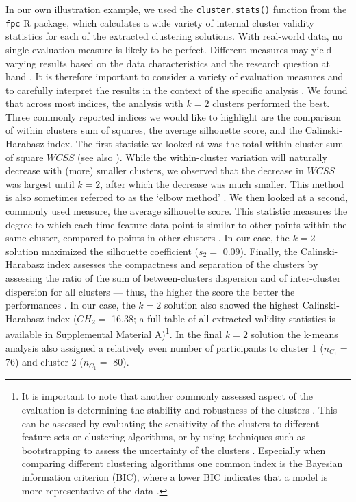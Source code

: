 In our own illustration example, we used the \texttt{cluster.stats()}
function from the \texttt{fpc} \textsf{R} package, which calculates a
wide variety of internal cluster validity statistics for each of the
extracted clustering solutions. With real-world data, no single
evaluation measure is likely to be perfect. Different measures may yield
varying results based on the data characteristics and the research
question at hand \citep{kittler1998}. It is therefore important to
consider a variety of evaluation measures and to carefully interpret the
results in the context of the specific analysis \citep{vinh2009}. We
found that across most indices, the analysis with \(k=2\) clusters
performed the best. Three commonly reported indices we would like to
highlight are the comparison of within clusters sum of squares, the
average silhouette score, and the Calinski-Harabasz index. The first
statistic we looked at was the total within-cluster sum of square
\(WCSS\) (see also ). While the within-cluster
variation will naturally decrease with (more) smaller clusters, we
observed that the decrease in \(WCSS\) was largest until \(k=2\), after
which the decrease was much smaller. This method is also sometimes
referred to as the `elbow method' \citep{syakur2018}. We then looked at
a second, commonly used measure, the average silhouette score. This
statistic measures the degree to which each time feature data point is
similar to other points within the same cluster, compared to points in
other clusters \citep{rousseeuw1987}. In our case, the \(k=2\) solution
maximized the silhouette coefficient (\(s_2=\) 0.09). Finally, the
Calinski-Harabasz index assesses the compactness and separation of the
clusters by assessing the ratio of the sum of between-clusters
dispersion and of inter-cluster dispersion for all clusters --- thus,
the higher the score the better the performances \citep{calinski1974}.
In our case, the \(k=2\) solution also showed the highest
Calinski-Harabasz index (\(CH_2=\) 16.38; a full table of all extracted
validity statistics is available in Supplemental Material
A)\footnote{It is important to note that another commonly assessed aspect of the evaluation is determining the stability and robustness of the clusters \citep{berkhin2006}. This can be assessed by evaluating the sensitivity of the clusters to different feature sets or clustering algorithms, or by using techniques such as bootstrapping to assess the uncertainty of the clusters \citep{vinh2009}. Especially when comparing different clustering algorithms one common index is the Bayesian information criterion (BIC), where a lower BIC indicates that a model is more representative of the data \citep{vandeschoot2017}.}.
In the final \(k=2\) solution the k-means analysis also assigned a
relatively even number of participants to cluster 1 (\(n_{C_1}=\) 76)
and cluster 2 (\(n_{C_1}=\) 80).

